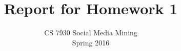 \documentclass{sig-alternate-05-2015}
\begin{document}



%

\title{Report for Homework 1}
\subtitle{CS 7930 Social Media Mining\\
Spring 2016}
%
%
%
%
%
\end{document}
